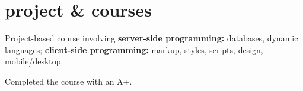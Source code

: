 \documentclass[]{farzad-resume}
\begin{document}
\begin{minipage}[t]{0.66\textwidth}
\section {project \& courses \fontsize{9}{10.8} \selectfont}

\vspace{\topsep}
\begin{tightemize}
{\fontsize{8}{10.4} \selectfont 
	\item Project-based course involving \textbf{server-side programming:} databases, dynamic languages; \textbf{ client-side programming:} markup, styles, scripts, design, mobile/desktop.
	\item Completed the course with an A+.}
\end{tightemize}




\end{minipage}
\end{document}
